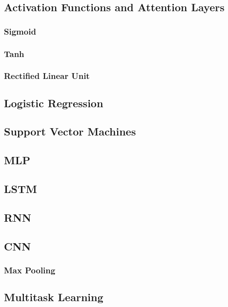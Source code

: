 \subsection{Activation Functions and Attention Layers}

\subsubsection{Sigmoid}

\subsubsection{Tanh}

\subsubsection{Rectified Linear Unit}

\subsection{Logistic Regression}

\subsection{Support Vector Machines}

\subsection{MLP}

\subsection{LSTM}

\subsection{RNN}

\subsection{CNN}

\subsubsection{Max Pooling}

\subsection{Multitask Learning}

